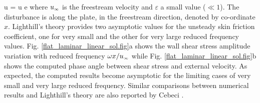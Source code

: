 %
\beq
  u = \varepsilon u\sm{\infty} e
\eeq
%
 where $u_{\mbox{\tiny $\infty$}}$ is the freestream velocity and $\varepsilon$ a small value ($\ll 1$).
 The disturbance is along the plate, in the freestream direction, denoted by co-ordinate $x$.
 Lighthill's \citeyear{Lighthill:1} theory provides two asymptotic values for
 the unsteady skin friction coefficient, one for very small and the other for very
 large reduced frequency values. Fig. \ref{flat_laminar_linear_sol.fig}a
 shows the wall shear stress amplitude variation with reduced frequency $\omega x/u_{\mbox{\tiny $\infty$}}$
 while Fig. \ref{flat_laminar_linear_sol.fig}b shows the computed phase angle
 between shear stress and external velocity. As expected, the computed results
 become asymptotic for the limiting cases of very small and very large reduced
 frequency. Similar comparisons between numerical results and Lighthill's theory
 are also reported by Cebeci \citeyear{Cebeci:1}.
%
%
%
